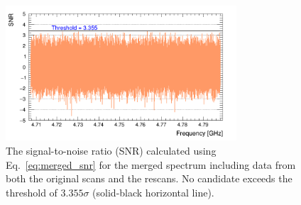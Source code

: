 \begin{figure}[hbt!]
    \centering
    \includegraphics[width=8.6cm]{figures/SNR_GrandSpectrum_AxionRun_AllSteps_Rescan_Merged_5bin_SG4_W201_LqWeight.png}
    \caption{The signal-to-noise ratio (SNR) calculated using Eq.~\eqref{eq:merged_snr} for the merged spectrum including data from both the original 
scans and the rescans. No candidate exceeds the threshold of 
$3.355\sigma$ (solid-black horizontal line). }
    \label{fig:SNR_merged}
\end{figure}
